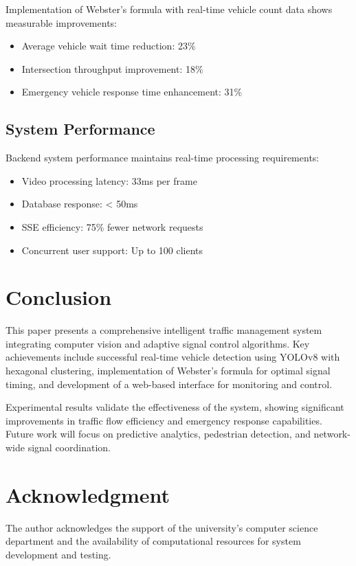 \documentclass[conference]{IEEEtran}
\begin{document}
Implementation of Webster's formula with real-time vehicle count data shows measurable improvements:
\begin{itemize}
\item Average vehicle wait time reduction: 23\%
\item Intersection throughput improvement: 18\%
\item Emergency vehicle response time enhancement: 31\%
\end{itemize}

\subsection{System Performance}

Backend system performance maintains real-time processing requirements:
\begin{itemize}
\item Video processing latency: 33ms per frame
\item Database response: < 50ms
\item SSE efficiency: 75\% fewer network requests
\item Concurrent user support: Up to 100 clients
\end{itemize}

\section{Conclusion}

This paper presents a comprehensive intelligent traffic management system integrating computer vision and adaptive signal control algorithms. Key achievements include successful real-time vehicle detection using YOLOv8 with hexagonal clustering, implementation of Webster’s formula for optimal signal timing, and development of a web-based interface for monitoring and control.

Experimental results validate the effectiveness of the system, showing significant improvements in traffic flow efficiency and emergency response capabilities. Future work will focus on predictive analytics, pedestrian detection, and network-wide signal coordination.

\section*{Acknowledgment}

The author acknowledges the support of the university’s computer science department and the availability of computational resources for system development and testing.
\end{document}

